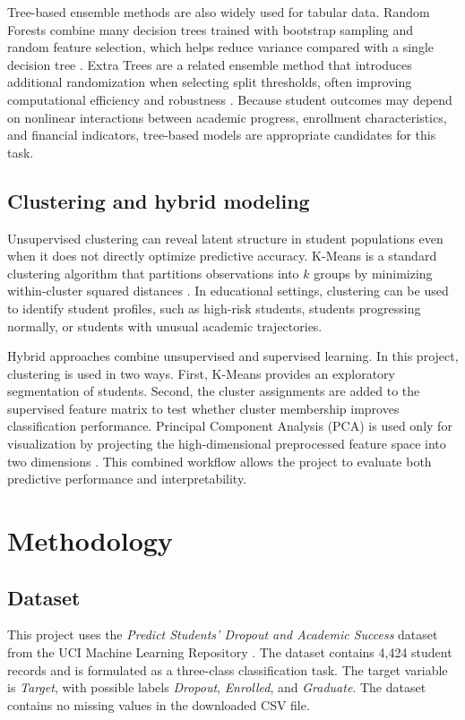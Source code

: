 \documentclass{article}
\begin{document}
Tree-based ensemble methods are also widely used for tabular data. Random Forests combine many decision trees trained with bootstrap sampling and random feature selection, which helps reduce variance compared with a single decision tree \citep{breiman2001random}. Extra Trees are a related ensemble method that introduces additional randomization when selecting split thresholds, often improving computational efficiency and robustness \citep{geurts2006extremely}. Because student outcomes may depend on nonlinear interactions between academic progress, enrollment characteristics, and financial indicators, tree-based models are appropriate candidates for this task.

\subsection{Clustering and hybrid modeling}

Unsupervised clustering can reveal latent structure in student populations even when it does not directly optimize predictive accuracy. K-Means is a standard clustering algorithm that partitions observations into \(k\) groups by minimizing within-cluster squared distances \citep{macqueen1967methods}. In educational settings, clustering can be used to identify student profiles, such as high-risk students, students progressing normally, or students with unusual academic trajectories.

Hybrid approaches combine unsupervised and supervised learning. In this project, clustering is used in two ways. First, K-Means provides an exploratory segmentation of students. Second, the cluster assignments are added to the supervised feature matrix to test whether cluster membership improves classification performance. Principal Component Analysis (PCA) is used only for visualization by projecting the high-dimensional preprocessed feature space into two dimensions \citep{jolliffe2016principal}. This combined workflow allows the project to evaluate both predictive performance and interpretability.

\section{Methodology}

\subsection{Dataset}

This project uses the \textit{Predict Students' Dropout and Academic Success} dataset from the UCI Machine Learning Repository \citep{uci2021dropout}. The dataset contains 4,424 student records and is formulated as a three-class classification task. The target variable is \textit{Target}, with possible labels \textit{Dropout}, \textit{Enrolled}, and \textit{Graduate}. The dataset contains no missing values in the downloaded CSV file.
\end{document}
